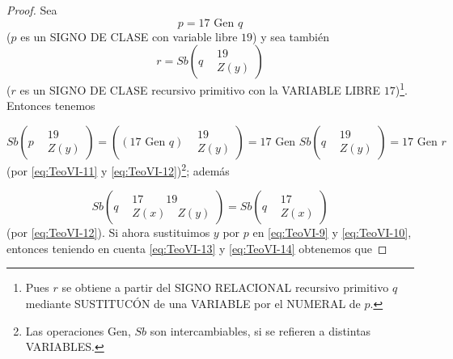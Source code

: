 \begin{proof}
    Sea 
    \begin{equation} \label{eq:TeoVI-11}
        p = 17 \text{ Gen } q
    \end{equation}
    ($p$ es un SIGNO DE CLASE con variable libre $19$) y sea también
    \begin{equation} \label{eq:TeoVI-12}
        r = Sb \left(q 
        \begin{aligned}
            &19 \\
            &Z(y)
        \end{aligned}
        \right)
    \end{equation}
    ($r$ es un SIGNO DE CLASE recursivo primitivo con la VARIABLE LIBRE $17$)\footnote{Pues $r$ se obtiene a partir del SIGNO RELACIONAL recursivo primitivo
    $q$ mediante SUSTITUCÓN de una VARIABLE por el NUMERAL de $p$.}. Entonces tenemos

    \begin{equation} \label{eq:TeoVI-13}
        Sb \left(p
        \begin{aligned}
            &19 \\
            &Z(y)
        \end{aligned}
        \right) = \left( (17 \text{ Gen } q)
        \begin{aligned}
            &19 \\
            &Z(y)
        \end{aligned}
        \right) = 17 \text{ Gen } Sb \left(q 
        \begin{aligned}
            &19 \\
            &Z(y)
        \end{aligned}
        \right) = 17 \text{ Gen } r
    \end{equation}
    (por \eqref{eq:TeoVI-11} y \eqref{eq:TeoVI-12})\footnote{Las operaciones Gen, $Sb$ son intercambiables, si se refieren a distintas VARIABLES.}; además

    \begin{equation} \label{eq:TeoVI-14}
        Sb\left(q 
        \begin{aligned}
            &17 \qquad 19 \\
            &Z(x)\quad Z(y)
        \end{aligned}
        \right) = Sb\left(q 
        \begin{aligned}
            &17 \\
            &Z(x)
        \end{aligned}
        \right)
    \end{equation}
    (por \eqref{eq:TeoVI-12}). Si ahora sustituimos $y$ por $p$ en \eqref{eq:TeoVI-9} y \eqref{eq:TeoVI-10}, entonces teniendo en cuenta  \eqref{eq:TeoVI-13} y 
    \eqref{eq:TeoVI-14} obtenemos que 


\end{proof}

